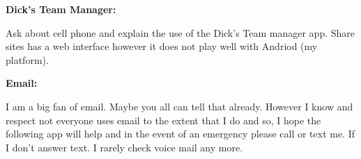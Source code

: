 \documentclass[10pt,letterpaper]{article}
\newenvironment{agendablock}[1]{%
    \tcolorbox[beamer,%
    noparskip,breakable,
    colback=LightGray,colframe=Black,%
    colbacklower=Gray!75!LightGray,%
    title=#1]}%
    {\endtcolorbox}
\newenvironment{evenBlock}[1]{%
    \tcolorbox[beamer,%
    noparskip,breakable,
    colback=LightGreen,colframe=DarkGreen,%
    colbacklower=LimeGreen!75!LightGreen,%
    title=#1]}%
    {\endtcolorbox}
\begin{document}
\begin{evenBlock}{Communication Preferences}
    
    \textbf{Dick's Team Manager:}
    
    Ask about cell phone and explain the use of the Dick's Team manager app.  Share sites has a web interface however it does not play well with Andriod (my platform). 
    
    \textbf{Email:}
    
    I am a big fan of email.  Maybe you all can tell that already.  However I know and respect not everyone uses email to the extent that I do and so, I hope the following app will help and in the event of an emergency please call or text me.  If I don't answer text.  I rarely check voice mail any more.
\end{evenBlock}

\begin{agendablock}{Questions}
    
\end{agendablock}
\end{document}
